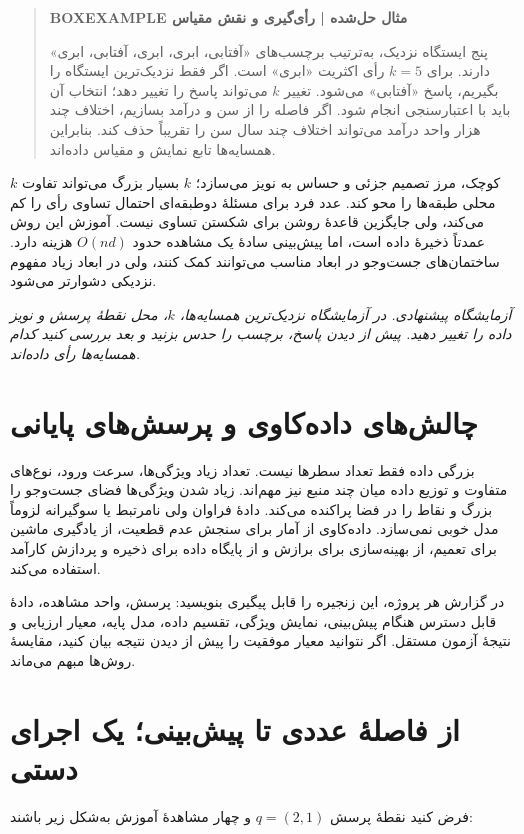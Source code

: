 \begin{quote}\textbf{BOXEXAMPLE مثال حل‌شده | رأی‌گیری و نقش مقیاس}\par 
پنج ایستگاه نزدیک، به‌ترتیب برچسب‌های «آفتابی، ابری، ابری، آفتابی، ابری» دارند. برای $k=5$ رأی اکثریت «ابری» است. اگر فقط نزدیک‌ترین ایستگاه را بگیریم، پاسخ «آفتابی» می‌شود. تغییر $k$ می‌تواند پاسخ را تغییر دهد؛ انتخاب آن باید با اعتبارسنجی انجام شود. اگر فاصله را از سن و درآمد بسازیم، اختلاف چند هزار واحد درآمد می‌تواند اختلاف چند سال سن را تقریباً حذف کند. بنابراین همسایه‌ها تابع نمایش و مقیاس داده‌اند.
\end{quote}

$k$ کوچک، مرز تصمیم جزئی و حساس به نویز می‌سازد؛ $k$ بسیار بزرگ می‌تواند تفاوت محلی طبقه‌ها را محو کند. عدد فرد برای مسئلهٔ دوطبقه‌ای احتمال تساوی رأی را کم می‌کند، ولی جایگزین قاعدهٔ روشن برای شکستن تساوی نیست. آموزش این روش عمدتاً ذخیرهٔ داده است، اما پیش‌بینی سادهٔ یک مشاهده حدود $O(nd)$ هزینه دارد. ساختمان‌های جست‌وجو در ابعاد مناسب می‌توانند کمک کنند، ولی در ابعاد زیاد مفهوم نزدیکی دشوارتر می‌شود.

\textit{آزمایشگاه پیشنهادی. در آزمایشگاه نزدیک‌ترین همسایه‌ها، $k$، محل نقطهٔ پرسش و نویز داده را تغییر دهید. پیش از دیدن پاسخ، برچسب را حدس بزنید و بعد بررسی کنید کدام همسایه‌ها رأی داده‌اند.}\par 

\section{چالش‌های داده‌کاوی و پرسش‌های پایانی}
بزرگی داده فقط تعداد سطرها نیست. تعداد زیاد ویژگی‌ها، سرعت ورود، نوع‌های متفاوت و توزیع داده میان چند منبع نیز مهم‌اند. زیاد شدن ویژگی‌ها فضای جست‌وجو را بزرگ و نقاط را در فضا پراکنده می‌کند. دادهٔ فراوان ولی نامرتبط یا سوگیرانه لزوماً مدل خوبی نمی‌سازد. داده‌کاوی از آمار برای سنجش عدم قطعیت، از یادگیری ماشین برای تعمیم، از بهینه‌سازی برای برازش و از پایگاه داده برای ذخیره و پردازش کارآمد استفاده می‌کند.

در گزارش هر پروژه، این زنجیره را قابل پیگیری بنویسید: پرسش، واحد مشاهده، دادهٔ قابل دسترس هنگام پیش‌بینی، نمایش ویژگی، تقسیم داده، مدل پایه، معیار ارزیابی و نتیجهٔ آزمون مستقل. اگر نتوانید معیار موفقیت را پیش از دیدن نتیجه بیان کنید، مقایسهٔ روش‌ها مبهم می‌ماند.
\section{از فاصلهٔ عددی تا پیش‌بینی؛ یک اجرای دستی}
فرض کنید نقطهٔ پرسش $q=(2,1)$ و چهار مشاهدهٔ آموزش به‌شکل زیر باشند:

